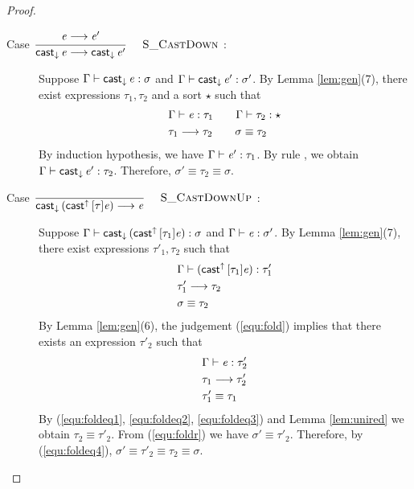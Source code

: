 \begin{proof}
\begin{description}
        \item[Case ${\displaystyle\frac{\begin{array}{l} {\mathit{e} \longrightarrow \mathit{e'}} \end{array}}{ \mathsf{cast}_{\downarrow} \, \mathit{e} \longrightarrow \mathsf{cast}_{\downarrow} \, \mathit{e'}}\quad\textsc{ {\textsc{S\_CastDown}}{} }}$:] $\quad$ \\
        Suppose $\Gamma  \vdash  \mathsf{cast}_{\downarrow} \, \mathit{e}  :  \sigma$ and $\Gamma  \vdash  \mathsf{cast}_{\downarrow} \, \mathit{e'}  :  \sigma'$. By Lemma \ref{lem:gen}(7), there exist expressions $\tau_{{\mathrm{1}}}, \tau_{{\mathrm{2}}}$ and a sort $\star$ such that 
        \begin{align*}
            &\Gamma  \vdash  \mathit{e}  :  \tau_{{\mathrm{1}}} \qquad \Gamma  \vdash  \tau_{{\mathrm{2}}}  :  \star \\
            &\tau_{{\mathrm{1}}}  \longrightarrow  \tau_{{\mathrm{2}}} \qquad \sigma  \equiv  \tau_{{\mathrm{2}}}
        \end{align*}
        By induction hypothesis, we have $\Gamma  \vdash  \mathit{e'}  :  \tau_{{\mathrm{1}}}$. By rule , we obtain $\Gamma  \vdash  \mathsf{cast}_{\downarrow} \, \mathit{e'}  :  \tau_{{\mathrm{2}}}$. Therefore, $\sigma'  \equiv  \tau_{{\mathrm{2}}}  \equiv  \sigma$.
        
        \item[Case ${\displaystyle\frac{\begin{array}{l} \end{array}}{ \mathsf{cast}_{\downarrow} \, ( \mathsf{cast}^{\uparrow} \, [ \tau ] \mathit{e} ) \longrightarrow \mathit{e}}\quad\textsc{ {\textsc{S\_CastDownUp}}{} }}$:] $\quad$ \\
        Suppose $\Gamma  \vdash  \mathsf{cast}_{\downarrow} \, (  \mathsf{cast}^{\uparrow} \, [  \tau_{{\mathrm{1}}}  ]  \mathit{e}  )  :  \sigma$ and $\Gamma  \vdash  \mathit{e}  :  \sigma'$. By Lemma \ref{lem:gen}(7), there exist expressions $\tau'_{{\mathrm{1}}}, \tau_{{\mathrm{2}}}$ such that 
        \begin{align}
            &\Gamma  \vdash  (  \mathsf{cast}^{\uparrow} \, [  \tau_{{\mathrm{1}}}  ]  \mathit{e}  )  :  \tau'_{{\mathrm{1}}} \label{equ:fold} \\
            &\tau'_{{\mathrm{1}}}  \longrightarrow  \tau_{{\mathrm{2}}} \label{equ:foldeq1} \\
            &\sigma  \equiv  \tau_{{\mathrm{2}}} \label{equ:foldeq4}
        \end{align}
        By Lemma \ref{lem:gen}(6), the judgement (\ref{equ:fold}) implies that there exists an expression $\tau'_{{\mathrm{2}}}$ such that
        \begin{align}
            &\Gamma  \vdash  \mathit{e}  :  \tau'_{{\mathrm{2}}} \label{equ:foldr} \\
            &\tau_{{\mathrm{1}}}  \longrightarrow  \tau'_{{\mathrm{2}}} \label{equ:foldeq2} \\
            &\tau'_{{\mathrm{1}}}  \equiv  \tau_{{\mathrm{1}}} \label{equ:foldeq3}
        \end{align}
        By (\ref{equ:foldeq1}, \ref{equ:foldeq2}, \ref{equ:foldeq3}) and Lemma \ref{lem:unired} we obtain $\tau_{{\mathrm{2}}}  \equiv  \tau'_{{\mathrm{2}}}$. From (\ref{equ:foldr}) we have $\sigma'  \equiv  \tau'_{{\mathrm{2}}}$. Therefore, by (\ref{equ:foldeq4}), $\sigma'  \equiv  \tau'_{{\mathrm{2}}}  \equiv  \tau_{{\mathrm{2}}}  \equiv  \sigma$.
        

\end{description}
\end{proof}
